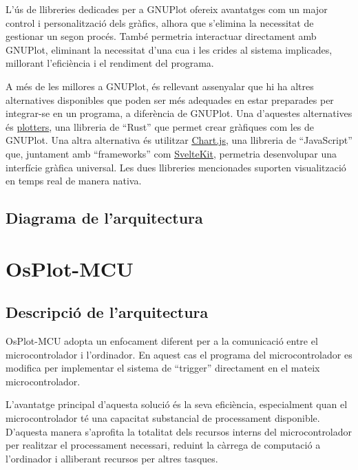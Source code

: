 \documentclass{tfgitic}[2023/06/30]
\begin{document}
L'ús de llibreries dedicades per a GNUPlot ofereix avantatges com un
major control i personalització dels gràfics, alhora que s'elimina la
necessitat de gestionar un segon procés. També permetria interactuar
directament amb GNUPlot, eliminant la necessitat d'una cua i les
crides al sistema implicades, millorant l'eficiència i el rendiment
del programa.

A més de les millores a GNUPlot, és rellevant assenyalar que hi ha
altres alternatives disponibles que poden ser més adequades en estar
preparades per integrar-se en un programa, a diferència de
GNUPlot. Una d'aquestes alternatives és
\href{https://docs.rs/plotters/latest/plotters}{\underline{plotters}},
una llibreria de ``Rust'' que permet crear gràfiques com les de
GNUPlot. Una altra alternativa és utilitzar
\href{https://www.chartjs.org/}{\underline{Chart.js}}, una llibreria
de ``JavaScript'' que, juntament amb ``frameworks'' com
\href{https://kit.svelte.dev/}{\underline{SvelteKit}}, permetria
desenvolupar una interfície gràfica universal. Les dues llibreries
mencionades suporten visualització en temps real de manera nativa.

\subsection{Diagrama de l'arquitectura}

\newpage

\section{OsPlot-MCU}

\subsection{Descripció de l'arquitectura}

OsPlot-MCU adopta un enfocament diferent per a la comunicació entre el
microcontrolador i l'ordinador. En aquest cas el programa del
microcontrolador es modifica per implementar el sistema de ``trigger''
directament en el mateix microcontrolador.

L'avantatge principal d'aquesta solució és la seva eficiència,
especialment quan el microcontrolador té una capacitat substancial de
processament disponible. D'aquesta manera s'aprofita la totalitat dels
recursos interns del microcontrolador per realitzar el processament
necessari, reduint la càrrega de computació a l'ordinador i alliberant
recursos per altres tasques.
\end{document}
